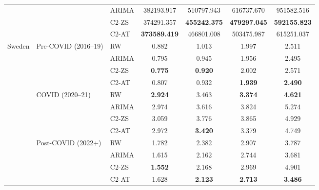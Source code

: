 \begin{tabular}{lllcccc}
 &  & ARIMA & 382193.917 & 510797.943 & 616737.670 & 951582.516 \\
 &  & C2-ZS & 374291.357 & \textbf{455242.375} & \textbf{479297.045} & \textbf{592155.823} \\
 &  & C2-AT & \textbf{373589.419} & 466801.008 & 503475.987 & 615251.037 \\
\midrule
\multirow{12}{*}{Sweden} & \multirow{4}{*}{Pre-COVID (2016--19)} & RW & 0.882 & 1.013 & 1.997 & 2.511 \\
 &  & ARIMA & 0.795 & 0.945 & 1.956 & 2.495 \\
 &  & C2-ZS & \textbf{0.775} & \textbf{0.920} & 2.002 & 2.571 \\
 &  & C2-AT & 0.807 & 0.932 & \textbf{1.939} & \textbf{2.490} \\
 & \multirow{4}{*}{COVID (2020--21)} & RW & \textbf{2.924} & 3.463 & \textbf{3.374} & \textbf{4.621} \\
 &  & ARIMA & 2.974 & 3.616 & 3.824 & 5.274 \\
 &  & C2-ZS & 3.059 & 3.776 & 3.865 & 4.929 \\
 &  & C2-AT & 2.972 & \textbf{3.420} & 3.379 & 4.749 \\
 & \multirow{4}{*}{Post-COVID (2022+)} & RW & 1.782 & 2.382 & 2.907 & 3.787 \\
 &  & ARIMA & 1.615 & 2.162 & 2.744 & 3.681 \\
 &  & C2-ZS & \textbf{1.552} & 2.168 & 2.969 & 4.901 \\
 &  & C2-AT & 1.628 & \textbf{2.123} & \textbf{2.713} & \textbf{3.486} \\
\bottomrule
\end{tabular}
